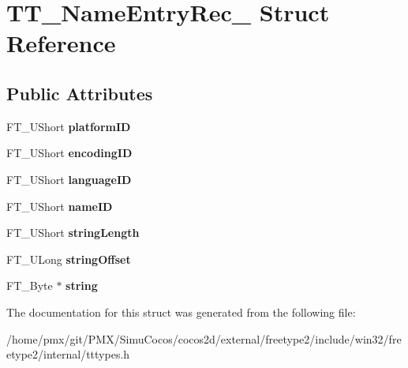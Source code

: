 \hypertarget{structTT__NameEntryRec__}{}\section{T\+T\+\_\+\+Name\+Entry\+Rec\+\_\+ Struct Reference}
\label{structTT__NameEntryRec__}
\subsection*{Public Attributes}
\begin{DoxyCompactItemize}
\item 
\mbox{\label{structTT__NameEntryRec___a9d4ee8bc42ed087f4533b6f664c0f6c6}} 
F\+T\+\_\+\+U\+Short {\bfseries platform\+ID}
\item 
\mbox{\label{structTT__NameEntryRec___a8e7403a2f37c7f7fdb3c19e9549d315c}} 
F\+T\+\_\+\+U\+Short {\bfseries encoding\+ID}
\item 
\mbox{\label{structTT__NameEntryRec___a2ec03c0ff0c542f403b45a515bb20afb}} 
F\+T\+\_\+\+U\+Short {\bfseries language\+ID}
\item 
\mbox{\label{structTT__NameEntryRec___abdaaec01d6620b3801f233cde5964548}} 
F\+T\+\_\+\+U\+Short {\bfseries name\+ID}
\item 
\mbox{\label{structTT__NameEntryRec___a736e5f8caeada86cc33f62acca6537f5}} 
F\+T\+\_\+\+U\+Short {\bfseries string\+Length}
\item 
\mbox{\label{structTT__NameEntryRec___a33ed41d4d3c4fffa74193f3b52e11870}} 
F\+T\+\_\+\+U\+Long {\bfseries string\+Offset}
\item 
\mbox{\label{structTT__NameEntryRec___a8f0510345615251039aff61be06a19da}} 
F\+T\+\_\+\+Byte $\ast$ {\bfseries string}
\end{DoxyCompactItemize}


The documentation for this struct was generated from the following file\+:\begin{DoxyCompactItemize}
\item 
/home/pmx/git/\+P\+M\+X/\+Simu\+Cocos/cocos2d/external/freetype2/include/win32/freetype2/internal/tttypes.\+h\end{DoxyCompactItemize}
